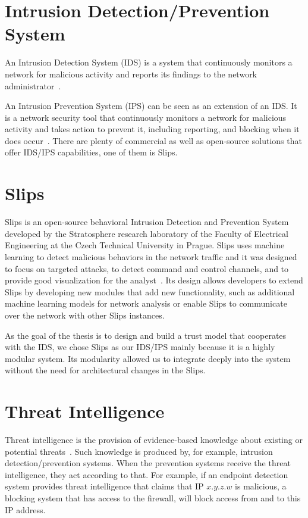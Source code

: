 \section{Intrusion Detection/Prevention System}
\label{sec:intrusion-detection-prevention-system}
An Intrusion Detection System (IDS) is a system that continuously monitors a network for malicious activity and reports its findings to the network administrator~\cite{barracuda}.

An Intrusion Prevention System (IPS) can be seen as an extension of an IDS. 
It is a network security tool that continuously monitors a network for malicious activity and takes action to prevent it, including reporting, and blocking when it does occur~\cite{vmware}.
There are plenty of commercial as well as open-source solutions that offer IDS/IPS capabilities, one of them is Slips.


\section{Slips}
\label{sec:slips}
Slips is an open-source behavioral Intrusion Detection and Prevention System developed by the Stratosphere research laboratory of the Faculty of Electrical Engineering at the Czech Technical University in Prague.
Slips uses machine learning to detect malicious behaviors in the network traffic and it was designed to focus on targeted attacks, to detect command and control channels, and to provide good visualization for the analyst~\cite{slips}.
Its design allows developers to extend Slips by developing new modules that add new functionality, such as additional machine learning models for network analysis or enable Slips to communicate over the network with other Slips instances.

As the goal of the thesis is to design and build a trust model that cooperates with the IDS, we chose Slips as our IDS/IPS mainly because it is a highly modular system.
Its modularity allowed us to integrate deeply into the system without the need for architectural changes in the Slips.

\section{Threat Intelligence}
\label{sec:threat-intelligence}
Threat intelligence is the provision of evidence-based knowledge about existing or potential threats~\cite{threatintelligence}.
Such knowledge is produced by, for example, intrusion 
detection/prevention systems.
When the prevention systems receive the threat intelligence, they act according to that.
For example, if an endpoint detection system provides threat intelligence that claims that IP $x.y.z.w$ is malicious, a blocking system that has access to the firewall, will block access from and to this IP address.

